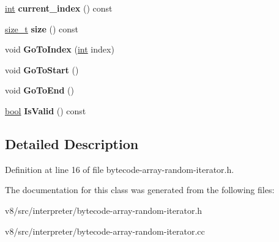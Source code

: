 \begin{DoxyCompactItemize}
\mbox{\label{classv8_1_1internal_1_1interpreter_1_1BytecodeArrayRandomIterator_a3f1f007803e5e5452754bf0a0d694f7f}} 
\mbox{\hyperlink{classint}{int}} {\bfseries current\+\_\+index} () const
\item 
\mbox{\label{classv8_1_1internal_1_1interpreter_1_1BytecodeArrayRandomIterator_aa8453184e5fd19a702e30d23dfdf2f6f}} 
\mbox{\hyperlink{classsize__t}{size\+\_\+t}} {\bfseries size} () const
\item 
\mbox{\label{classv8_1_1internal_1_1interpreter_1_1BytecodeArrayRandomIterator_a13ceeba33465ca526c6343734dea179c}} 
void {\bfseries Go\+To\+Index} (\mbox{\hyperlink{classint}{int}} index)
\item 
\mbox{\label{classv8_1_1internal_1_1interpreter_1_1BytecodeArrayRandomIterator_aaee1a0a931f8f14533d7a0a59eaf6a0f}} 
void {\bfseries Go\+To\+Start} ()
\item 
\mbox{\label{classv8_1_1internal_1_1interpreter_1_1BytecodeArrayRandomIterator_ab975ec71287579b523e16998a2420048}} 
void {\bfseries Go\+To\+End} ()
\item 
\mbox{\label{classv8_1_1internal_1_1interpreter_1_1BytecodeArrayRandomIterator_a25f4e69d258c1896ed7ea43b93386eca}} 
\mbox{\hyperlink{classbool}{bool}} {\bfseries Is\+Valid} () const
\end{DoxyCompactItemize}


\subsection{Detailed Description}


Definition at line 16 of file bytecode-\/array-\/random-\/iterator.\+h.



The documentation for this class was generated from the following files\+:\begin{DoxyCompactItemize}
\item 
v8/src/interpreter/bytecode-\/array-\/random-\/iterator.\+h\item 
v8/src/interpreter/bytecode-\/array-\/random-\/iterator.\+cc\end{DoxyCompactItemize}
